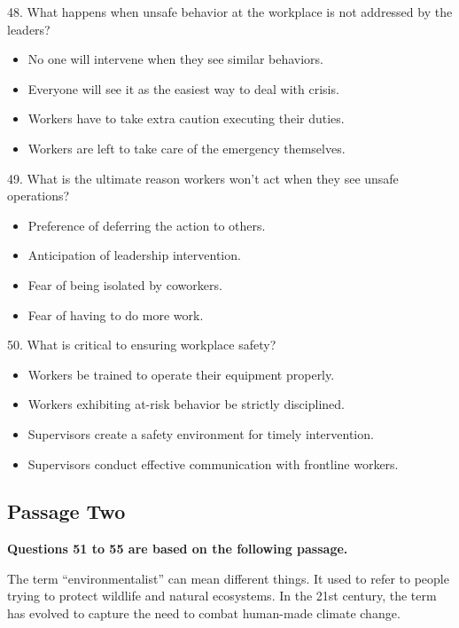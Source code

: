 \documentclass[UTF8,11pt]{ctexart}
\begin{document}
48. What happens when unsafe behavior at the workplace is not addressed by the leaders?


\begin{itemize}[leftmargin=2em,itemsep=.2em,topsep=.4em]\item[A.] No one will intervene when they see similar behaviors.
\item[B.] Everyone will see it as the easiest way to deal with crisis.
\item[C.] Workers have to take extra caution executing their duties.
\item[D.] Workers are left to take care of the emergency themselves.
\end{itemize}

49. What is the ultimate reason workers won’t act when they see unsafe operations?


\begin{itemize}[leftmargin=2em,itemsep=.2em,topsep=.4em]\item[A.] Preference of deferring the action to others.
\item[B.] Anticipation of leadership intervention.
\item[C.] Fear of being isolated by coworkers.
\item[D.] Fear of having to do more work.
\end{itemize}

50. What is critical to ensuring workplace safety?


\begin{itemize}[leftmargin=2em,itemsep=.2em,topsep=.4em]\item[A.] Workers be trained to operate their equipment properly.
\item[B.] Workers exhibiting at-risk behavior be strictly disciplined.
\item[C.] Supervisors create a safety environment for timely intervention.
\item[D.] Supervisors conduct effective communication with frontline workers.
\end{itemize}

\subsection*{\textbf{Passage Two}}


\textbf{Questions 51 to 55 are based on the following passage.}


The term “environmentalist” can mean different things. It used to refer to people trying to protect wildlife and natural ecosystems. In the 21st century, the term has evolved to capture the need to combat human-made climate change.
\end{document}
